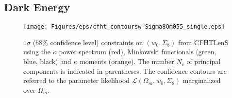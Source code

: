 \subsection{Dark Energy}

\begin{figure}
\begin{center}
\texttt{[image: Figures/eps/cfht\_contoursw-Sigma8Om055\_single.eps]}
\end{center}
\caption{$1\sigma$ (68\% confidence level) constraints on $(w_0,\Sigma_8)$ from CFHTLenS using the $\kappa$ power spectrum (red), Minkowski functionals (green, blue, black) and $\kappa$ moments (orange). The number $N_c$ of principal components is indicated in parentheses. The confidence contours are referred to the parameter likelihood $\mathcal{L}(\Omega_m,w_0,\Sigma_8)$ marginalized over $\Omega_m$.}
\label{fig:6:cwSi855signle}
\end{figure}


